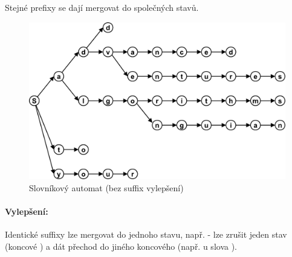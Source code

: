 Stejné prefixy se dají mergovat do společných stavů.

\begin{figure}[h]
    \begin{center}
        \includegraphics[width=120mm]{04/images/slovnikovy-automat}
    \end{center}
    \caption{Slovníkový automat (bez suffix vylepšení)}
\end{figure}

\paragraph{Vylepšení:} Identické suffixy lze mergovat do jednoho stavu, např.  - lze zrušit jeden stav (koncové ) a dát přechod do jiného koncového  (např. u slova ).